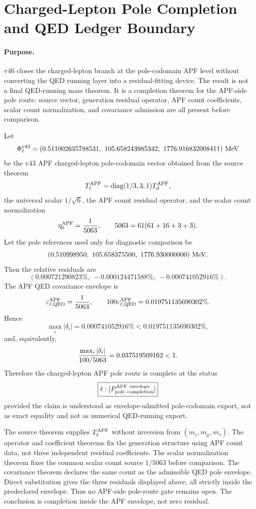 

\section{{Charged-Lepton Pole Completion and QED Ledger Boundary}}
\label{{sec:charged-lepton-pole-completion-v46}}

\paragraph{{Purpose.}}
v46 closes the charged-lepton branch at the pole-codomain APF level without converting the QED running layer into a residual-fitting device.  The result is not a final QED-running mass theorem.  It is a completion theorem for the APF-side pole route: source vector, generation residual operator, APF count coefficients, scalar count normalization, and covariance admission are all present before comparison.

\begin{{theorem}}[Charged-lepton pole completion under the APF QED envelope]
Let
\[
\Phi_\ell^{{\rm v43}}
=(0.511002635788531,\ 105.658243985342,\ 1776.916832008411)\ {\rm MeV}
\]
be the v43 APF charged-lepton pole-codomain vector obtained from the source theorem
\[
T_\ell^{{\rm APF}}=\operatorname{{diag}}(1/3,3,1)T_d^{{\rm APF}},
\]
the universal scalar \(1/\sqrt 6\), the APF count residual operator, and the scalar count normalization
\[
\eta_0^{{\rm APF}}={1\over 5063},\qquad
5063=61(61+16+3+3).
\]
Let the pole references used only for diagnostic comparison be
\[
(0.510998950,\ 105.658375500,\ 1776.930000000)\ {\rm MeV}.
\]
Then the relative residuals are
\[
(0.000721290823\%,\ -0.000124471588\%,\ -0.000741052916\%).
\]
The APF QED covariance envelope is
\[
\varepsilon_{{\ell},{\rm QED}}^{{\rm APF}}={1\over 5063},
\qquad
100\varepsilon_{{\ell},{\rm QED}}^{{\rm APF}}=0.019751135690302\%.
\]
Hence
\[
\max_i |\delta_i| = 0.000741052916\%
<0.019751135690302\%,
\]
and, equivalently,
\[
{\max_i |\delta_i|\over 100/5063}=0.037519509162<1.
\]
Therefore the charged-lepton APF pole route is complete at the status
\[
\boxed{{
\ell:
[P_{{\rm pole\ completion}}^{{\rm APF\ envelope}}]
}}
\]
provided the claim is understood as envelope-admitted pole-codomain export, not as exact equality and not as numerical QED-running export.
\end{{theorem}}

\begin{{proof}}[Proof sketch]
The source theorem supplies \(T_\ell^{{\rm APF}}\) without inversion from \((m_e,m_\mu,m_\tau)\).  The operator and coefficient theorems fix the generation structure using APF count data, not three independent residual coefficients.  The scalar normalization theorem fixes the common scalar count source \(1/5063\) before comparison.  The covariance theorem declares the same count as the admissible QED pole envelope.  Direct substitution gives the three residuals displayed above, all strictly inside the predeclared envelope.  Thus no APF-side pole-route gate remains open.  The conclusion is completion inside the APF envelope, not zero residual.
\end{{proof}}

